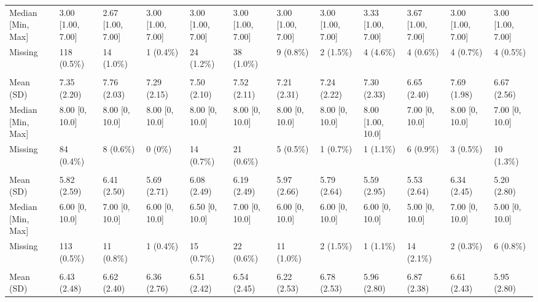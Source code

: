 \documentclass[
  single column]{article}
\begin{document}
\begin{landscape}
\begin{tabular}[t]{llllllllllll}
\hspace{1em}Median [Min, Max] & 3.00 [1.00, 7.00] & 2.67 [1.00, 7.00] & 3.00 [1.00, 7.00] & 3.00 [1.00, 7.00] & 3.00 [1.00, 7.00] & 3.00 [1.00, 7.00] & 3.00 [1.00, 7.00] & 3.33 [1.00, 7.00] & 3.67 [1.00, 7.00] & 3.00 [1.00, 7.00] & 3.00 [1.00, 7.00]\\
\hspace{1em}Missing & 118 (0.5\%) & 14 (1.0\%) & 1 (0.4\%) & 24 (1.2\%) & 38 (1.0\%) & 9 (0.8\%) & 2 (1.5\%) & 4 (4.6\%) & 4 (0.6\%) & 4 (0.7\%) & 4 (0.5\%)\\
\addlinespace[0.3em]
\multicolumn{12}{l}{\textbf{pwb\_standard\_living}}\\
\hspace{1em}Mean (SD) & 7.35 (2.20) & 7.76 (2.03) & 7.29 (2.15) & 7.50 (2.10) & 7.52 (2.11) & 7.21 (2.31) & 7.24 (2.22) & 7.30 (2.33) & 6.65 (2.40) & 7.69 (1.98) & 6.67 (2.56)\\
\hspace{1em}Median [Min, Max] & 8.00 [0, 10.0] & 8.00 [0, 10.0] & 8.00 [0, 10.0] & 8.00 [0, 10.0] & 8.00 [0, 10.0] & 8.00 [0, 10.0] & 8.00 [0, 10.0] & 8.00 [1.00, 10.0] & 7.00 [0, 10.0] & 8.00 [0, 10.0] & 7.00 [0, 10.0]\\
\hspace{1em}Missing & 84 (0.4\%) & 8 (0.6\%) & 0 (0\%) & 14 (0.7\%) & 21 (0.6\%) & 5 (0.5\%) & 1 (0.7\%) & 1 (1.1\%) & 6 (0.9\%) & 3 (0.5\%) & 10 (1.3\%)\\
\addlinespace[0.3em]
\multicolumn{12}{l}{\textbf{pwb\_your\_future\_security}}\\
\hspace{1em}Mean (SD) & 5.82 (2.59) & 6.41 (2.50) & 5.69 (2.71) & 6.08 (2.49) & 6.19 (2.49) & 5.97 (2.66) & 5.79 (2.64) & 5.59 (2.95) & 5.53 (2.64) & 6.34 (2.45) & 5.20 (2.80)\\
\hspace{1em}Median [Min, Max] & 6.00 [0, 10.0] & 7.00 [0, 10.0] & 6.00 [0, 10.0] & 6.50 [0, 10.0] & 7.00 [0, 10.0] & 6.00 [0, 10.0] & 6.00 [0, 10.0] & 6.00 [0, 10.0] & 5.00 [0, 10.0] & 7.00 [0, 10.0] & 5.00 [0, 10.0]\\
\hspace{1em}Missing & 113 (0.5\%) & 11 (0.8\%) & 1 (0.4\%) & 15 (0.7\%) & 22 (0.6\%) & 11 (1.0\%) & 2 (1.5\%) & 1 (1.1\%) & 14 (2.1\%) & 2 (0.3\%) & 6 (0.8\%)\\
\addlinespace[0.3em]
\multicolumn{12}{l}{\textbf{pwb\_your\_health}}\\
\hspace{1em}Mean (SD) & 6.43 (2.48) & 6.62 (2.40) & 6.36 (2.76) & 6.51 (2.42) & 6.54 (2.45) & 6.22 (2.53) & 6.78 (2.53) & 5.96 (2.80) & 6.87 (2.38) & 6.61 (2.43) & 5.95 (2.80)\\

\end{tabular}
\end{landscape}
\end{document}
